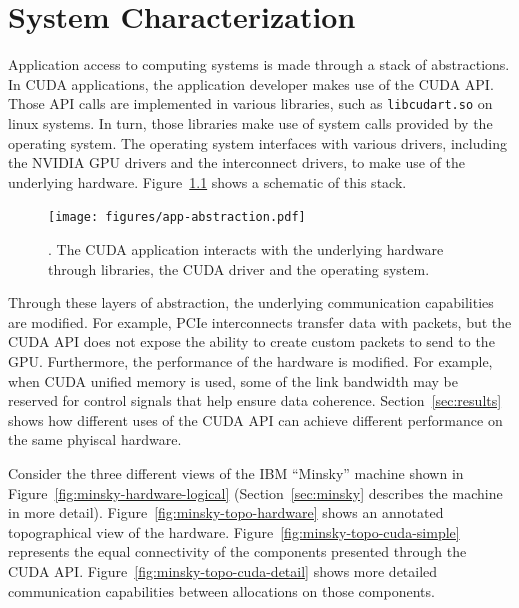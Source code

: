 \chapter{System Characterization}
\label{ch:sys-char}

Application access to computing systems is made through a stack of abstractions.
In CUDA applications, the application developer makes use of the CUDA API.
Those API calls are implemented in various libraries, such as \texttt{libcudart.so} on linux systems.
In turn, those libraries make use of system calls provided by the operating system.
The operating system interfaces with various drivers, including the NVIDIA GPU drivers and the interconnect drivers, to make use of the underlying hardware.
Figure~\ref{fig:app-abstraction} shows a schematic of this stack.

\begin{figure}[ht]
    \centering
    \texttt{[image: figures/app-abstraction.pdf]}
    \caption[]{. The CUDA application interacts with the underlying hardware through libraries, the CUDA driver and the operating system.}
    \label{fig:app-abstraction}
\end{figure}

Through these layers of abstraction, the underlying communication capabilities are modified.
For example, PCIe interconnects transfer data with packets, but the CUDA API does not expose the ability to create custom packets to send to the GPU.
Furthermore, the performance of the hardware is modified.
For example, when CUDA unified memory is used, some of the link bandwidth may be reserved for control signals that help ensure data coherence.
Section~\ref{sec:results} shows how different uses of the CUDA API can achieve different performance on the same phyiscal hardware.

Consider the three different views of the IBM ``Minsky'' machine shown in Figure~\ref{fig:minsky-hardware-logical} (Section~\ref{sec:minsky} describes the machine in more detail).
Figure~\ref{fig:minsky-topo-hardware}    shows an annotated topographical view of the hardware.
Figure~\ref{fig:minsky-topo-cuda-simple} represents the equal connectivity of the components presented through the CUDA API.
Figure~\ref{fig:minsky-topo-cuda-detail} shows more detailed communication capabilities between allocations on those components.

